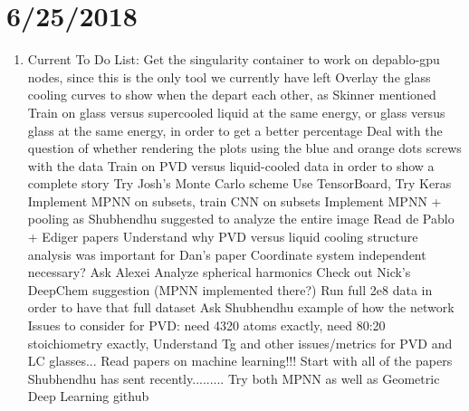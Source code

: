 \documentclass[12pt,reqno]{amsart}
\numberwithin{equation}{section}
\begin{document}
\section{6/25/2018}
\begin{enumerate}
\item Current To Do List:
\subitem Get the singularity container to work on depablo-gpu nodes, since this is the only tool we currently have left  
\subitem Overlay the glass cooling curves to show when the depart each other, as Skinner mentioned
\subitem Train on glass versus supercooled liquid at the same energy, or glass versus glass at the same energy, in order to get a better percentage
\subitem Deal with the question of whether rendering the plots using the blue and orange dots screws with the data
\subitem Train on PVD versus liquid-cooled data in order to show a complete story
\subitem Try Josh's Monte Carlo scheme 
\subitem Use TensorBoard, Try Keras
\subitem Implement MPNN on subsets, train CNN on subsets
\subitem Implement MPNN + pooling as Shubhendhu suggested to analyze the entire image 
\subitem Read de Pablo + Ediger papers
\subitem Understand why PVD versus liquid cooling structure analysis was important for Dan's paper
\subitem Coordinate system independent necessary?  Ask Alexei 
\subitem Analyze spherical harmonics
\subitem Check out Nick's DeepChem suggestion (MPNN implemented there?)
\subitem Run full 2e8 data in order to have that full dataset
\subitem Ask Shubhendhu example of how the network
\subitem Issues to consider for PVD: need 4320 atoms exactly, need 80:20 stoichiometry exactly, 
\subitem Understand Tg and other issues/metrics for PVD and LC glasses...
\subitem Read papers on machine learning!!! Start with all of the papers Shubhendhu has sent recently.........
\subitem Try both MPNN as well as Geometric Deep Learning github



\end{enumerate}
\end{document}
